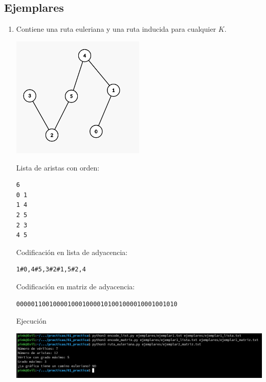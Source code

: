 \documentclass[11pt]{article}
\begin{document}
\subsection*{Ejemplares}
\begin{enumerate}
\item Contiene una ruta euleriana y una ruta inducida para
  cualquier $K$.
  \begin{center}
    \includegraphics[width=0.5\textwidth]{ejemplar1.png}
  \end{center}
Lista de aristas con orden:
\begin{verbatim}
6
0 1
1 4
2 5
2 3
4 5
\end{verbatim}

Codificación en lista de adyacencia:
\begin{verbatim}
1#0,4#5,3#2#1,5#2,4
\end{verbatim}

Codificación en matriz de adyacencia:
\begin{verbatim}
00000110010000100010000101001000010001001010
\end{verbatim}

Ejecución
\begin{center}
  \includegraphics[width=\textwidth]{ejecucion1.png}
\end{center}


\end{enumerate}
\end{document}

